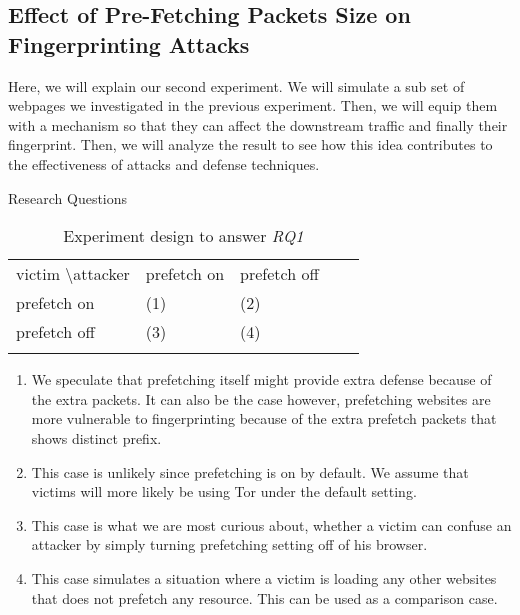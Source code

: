 \subsection{Effect of Pre-Fetching Packets Size on Fingerprinting Attacks}
Here, we will explain our second experiment. We will simulate a sub set of webpages we investigated in the previous experiment. Then, we will equip them with a mechanism so that they can affect the downstream traffic and finally their fingerprint. Then, we will analyze the result to see how this idea contributes to the effectiveness of attacks and defense techniques.


Research Questions

\begin{table}[]
\centering
\caption{Experiment design to answer {\it RQ1}}
\label{table:prefetch}
\begin{tabular}{lllll}
\cline{1-3}
\multicolumn{1}{|l|}{victim \textbackslash attacker} & \multicolumn{1}{l|}{prefetch on} & \multicolumn{1}{l|}{prefetch off} &  &  \\ \cline{1-3}
\multicolumn{1}{|l|}{prefetch on}                    & \multicolumn{1}{l|}{(1)}         & \multicolumn{1}{l|}{(2)}          &  &  \\ \cline{1-3}
\multicolumn{1}{|l|}{prefetch off}                   & \multicolumn{1}{l|}{(3)}         & \multicolumn{1}{l|}{(4)}          &  &  \\ \cline{1-3}
                                                     &                                  &                                   &  & 
\end{tabular}                  
\end{table}

\begin{enumerate}
\item
We speculate that prefetching itself might provide extra defense because of the extra packets.
It can also be the case however, prefetching websites are more vulnerable to fingerprinting because of the extra prefetch packets that shows distinct prefix.
\item
This case is unlikely since prefetching is on by default. We assume that victims will more likely be using Tor under the default setting.
\item
This case is what we are most curious about, whether a victim can confuse an attacker by simply turning prefetching setting off of his browser.
\item
This case simulates a situation where a victim is loading any other websites that does not prefetch any resource.
This can be used as a comparison case.
\end{enumerate}
